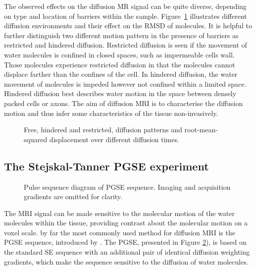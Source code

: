 The observed effects on the diffusion MR signal can be quite diverse, depending on type and location of barriers within the sample. Figure~\ref{fig:chapter 2 types of diffusion} illustrates different diffusion environments and their effect on the \gls{RMSD} of molecules. It is helpful to further distinguish two different motion pattern in the presence of barriers as restricted and hindered diffusion.  Restricted diffusion is seen if the movement of water molecules is confined in closed spaces, such as impermeable cells wall. Those molecules experience restricted diffusion in that the molecules cannot displace farther than the confines of the cell. In hindered diffusion, the water movement of molecules is impeded however not confined within a limited space. Hindered diffusion best describes water motion in the space between densely packed cells or axons. The aim of diffusion MRI is to characterise the diffusion motion and thus infer some characteristics of the tissue non-invasively.


\begin{figure}[ht]
 \centering
  \hspace*{0.15\textwidth}
  \caption{Free, hindered and restricted,  diffusion patterns and root-mean-squared displacement over different diffusion times.}
  \label{fig:chapter 2 types of diffusion}
\end{figure}

\subsection{The Stejskal-Tanner PGSE experiment}
\begin{figure}[ht]
\centering
{}
\caption{Pulse sequence diagram of PGSE sequence. Imaging and acquisition gradients are omitted for clarity.}
\label{fig:chapter2 pgse_diagram}
\end{figure}

The MRI signal can be made sensitive to the molecular motion of the water molecules within the tissue, providing contrast about the molecular motion on a voxel scale. by far the most commonly used method for diffusion MRI is the {\gls{PGSE}} sequence, introduced by \citep{Stejskal:1965}. The {\gls{PGSE}}, presented in Figure \ref{fig:chapter2 pgse_diagram}), is based on the standard SE sequence with an additional pair of identical diffusion weighting gradients, which make the sequence sensitive to the diffusion of water molecules. 


